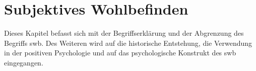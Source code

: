 %
%
\chapter{Subjektives Wohlbefinden}\label{chap.swb}
\glsresetall
Dieses Kapitel befasst sich mit der Begriffserklärung und der Abgrenzung des Begriffs \gls{swb}. Des Weiteren wird auf die historische Entstehung, die Verwendung in der positiven Psychologie und auf das psychologische Konstrukt des \gls{swb} eingegangen.

